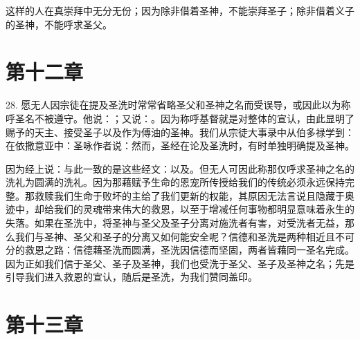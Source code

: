 这样的人在真崇拜中无分无份；因为除非借着圣神，不能崇拜圣子；除非借着义子的圣神，不能呼求圣父。\par


\section{第十二章}

\par

28. 愿无人因宗徒在提及圣洗时常常省略圣父和圣神之名而受误导，或因此以为称呼圣名不被遵守。他说：；又说：。因为称呼基督就是对整体的宣认，由此显明了赐予的天主、接受圣子以及作为傅油的圣神。我们从宗徒大事录中从伯多禄学到：在依撒意亚中：圣咏作者说：然而，圣经在论及圣洗时，有时单独明确提及圣神。\par

因为经上说：与此一致的是这些经文：以及。但无人可因此称那仅呼求圣神之名的洗礼为圆满的洗礼。因为那藉赋予生命的恩宠所传授给我们的传统必须永远保持完整。那救赎我们生命于败坏的主给了我们更新的权能，其原因无法言说且隐藏于奥迹中，却给我们的灵魂带来伟大的救恩，以至于增减任何事物都明显意味着永生的失落。如果在圣洗中，将圣神与圣父及圣子分离对施洗者有害，对受洗者无益，那么我们与圣神、圣父和圣子的分离又如何能安全呢？信德和圣洗是两种相近且不可分的救恩之路：信德藉圣洗而圆满，圣洗因信德而坚固，两者皆藉同一圣名完成。因为正如我们信于圣父、圣子及圣神，我们也受洗于圣父、圣子及圣神之名；先是引导我们进入救恩的宣认，随后是圣洗，为我们赞同盖印。\par


\section{第十三章}

\par

